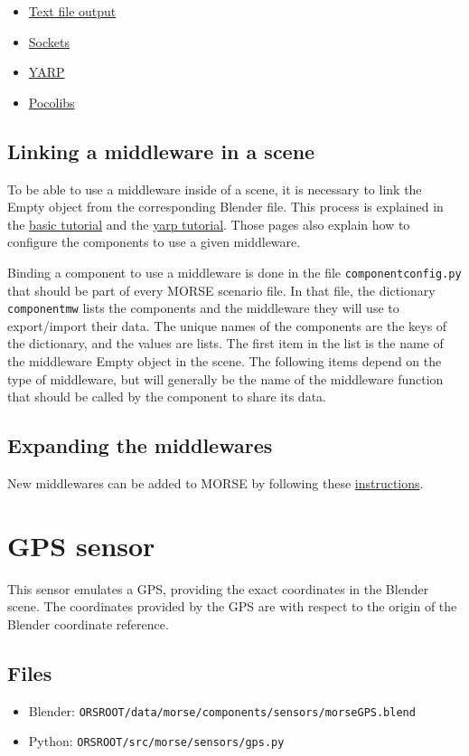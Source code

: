 \documentclass[twoside,a4paper,10pt]{report}
\newcommand{\dokutitlelevelone}[1]{\chapter{#1}}
\newcommand{\dokutitleleveltwo}[1]{\section{#1}}
\newcommand{\dokumonospace}[1]{\texttt{#1}}
\newcommand{\dokuitem}{\item}
\begin{document}
\begin{itemize}
\dokuitem  \hyperref[1cb251ec0d568de6a929b520c4aed8d1]{ Text file output}
\dokuitem  \hyperref[61f2529360aec54f5dc9804b842cf3fa]{ Sockets}
\dokuitem  \hyperref[ec46d0b85077d7a7fe8da2e2b4c70462]{ YARP}
\dokuitem  \hyperref[15f13a3fccdd1ef095539316b61c03c8]{ Pocolibs}
\end{itemize}

\dokutitleleveltwo{Linking a middleware in a scene}
\label{5ded332fc3ba470e4d4d290c9bf26a19}%

To be able to use a middleware inside of a scene, it is necessary to link the Empty object from the corresponding Blender file. This process is explained in the \hyperref[0575c8d592fb7b088226750aceec2b4e]{ basic tutorial} and the \hyperref[1dd029a60f7f3dd1deaf993ce4538edf]{ yarp tutorial}. Those pages also explain how to configure the components to use a given middleware.

Binding a component to use a middleware is done in the file \dokumonospace{component{\textunderscore}config.py} that should be part of every MORSE scenario file. In that file, the dictionary \dokumonospace{component{\textunderscore}mw} lists the components and the middleware they will use to export/import their data. The unique names of the components are the keys of the dictionary, and the values are lists. The first item in the list is the name of the middleware Empty object in the scene. The following items depend on the type of middleware, but will generally be the name of the middleware function that should be called by the component to share its data.


\dokutitleleveltwo{Expanding the middlewares}
\label{b3a6313d335453f4c7ad970485acc1a1}%

New middlewares can be added to MORSE by following these \hyperref[6a8f80abb2f3d2288ad863e67f2499a4]{ instructions}.


\dokutitlelevelone{GPS sensor}
\label{fa7c7c892a3b7d9c01ef03ed367274b8}%
\label{11648e4e66e7ed6a86cb7f1d0cf604fe}%

This sensor emulates a GPS, providing the exact coordinates in the Blender scene. The coordinates provided by the GPS are with respect to the origin of the Blender coordinate reference.


\dokutitleleveltwo{Files}
\label{45b963397aa40d4a0063e0d85e4fe7a1}%

\begin{itemize}
\dokuitem  Blender: \dokumonospace{{\textdollar}ORS{\textunderscore}ROOT/data/morse/components/sensors/morse{\textunderscore}GPS.blend}
\dokuitem  Python: \dokumonospace{{\textdollar}ORS{\textunderscore}ROOT/src/morse/sensors/gps.py}
\end{itemize}
\end{document}
